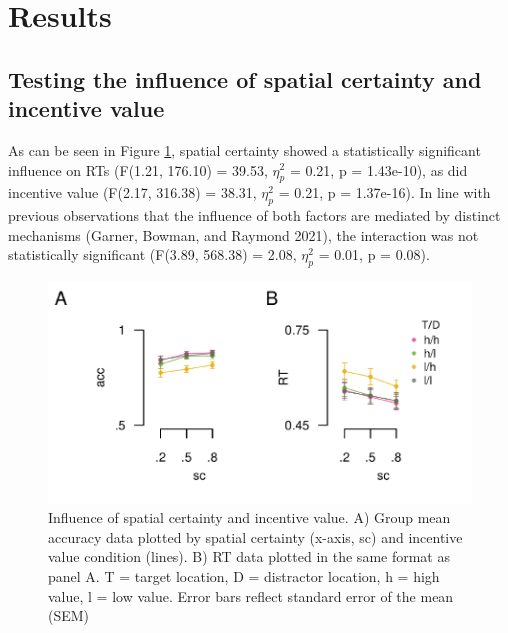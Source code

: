 \documentclass[11pt,halfline,a4paper,]{ouparticle}
\begin{document}
\hypertarget{results}{%
\section{Results}\label{results}}

\label{sec:Results}

\hypertarget{testing-the-influence-of-spatial-certainty-and-incentive-value}{%
\subsection{Testing the influence of spatial certainty and incentive value}\label{testing-the-influence-of-spatial-certainty-and-incentive-value}}

\label{sec:GrpLvl}

As can be seen in Figure \ref{fig:grpbehavfig}, spatial certainty showed a statistically significant influence on RTs (F(1.21, 176.10) = 39.53, \(\eta_{p}^2\) = 0.21, p = 1.43e-10), as did incentive value (F(2.17, 316.38) = 38.31, \(\eta_{p}^2\) = 0.21, p = 1.37e-16). In line with previous observations that the influence of both factors are mediated by distinct mechanisms (Garner, Bowman, and Raymond 2021), the interaction was not statistically significant (F(3.89, 568.38) = 2.08, \(\eta_{p}^2\) = 0.01, p = 0.08).

\begin{figure}[p]

{\centering \includegraphics[width=1\linewidth]{../images/doc-grp-level-behav} 

}

\caption{Influence of spatial certainty and incentive value. A) Group mean accuracy data plotted by spatial certainty (x-axis, sc) and incentive value condition (lines). B) RT data plotted in the same format as panel A. T = target location, D = distractor location, h = high value, l = low value. Error bars reflect standard error of the mean (SEM)}\label{fig:grpbehavfig}
\end{figure}
\end{document}
